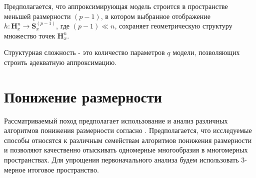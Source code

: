 \documentclass[12pt,twoside]{article}
\begin{document}
Предполагается, что аппроксимирующая модель строится в пространстве меньшей размерности $(p-1)$, в котором выбранное отображение $h: \mathbf{H}_{x}^{n} \xrightarrow{} \mathbf{S}_x^{(p-1)} $, где $(p-1)\ll n$, сохраняет геометрическую структуру множество точек $\mathbf{H}_{x}^{n}$. 

\begin{Def}
Структурная сложность - это количество параметров $q$ модели, позволяющих строить адекватную аппроксимацию.
\end{Def}

\section{Понижение размерности}
Рассматриваемый поход предполагает использование и анализ различных алгоритмов понижения размерности согласно \cite{Maaten2007}.
Предполагается, что исследуемые способы относятся к различным семействам алгоритмов понижения размерности и позволяют качественно отыскивать одномерные многообразия в многомерных пространствах.
Для упрощения первоначального анализа будем использовать 3-мерное итоговое пространство.
\end{document}
